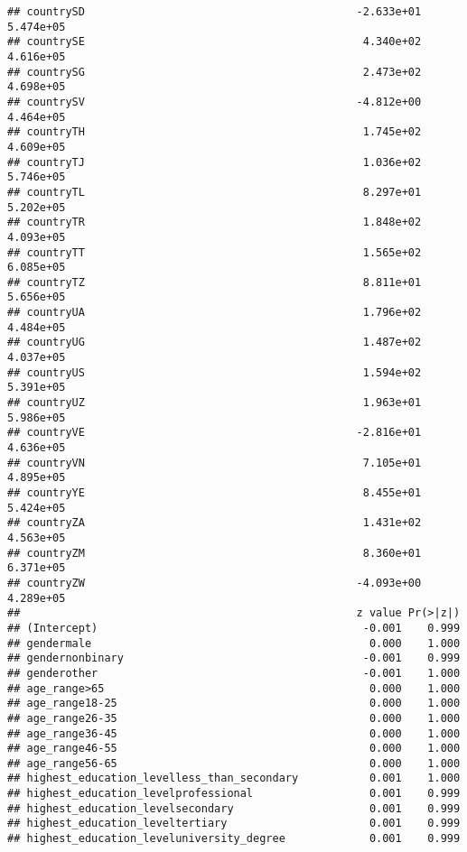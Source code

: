\documentclass[
]{article}
\begin{document}
\begin{verbatim}
## countrySD                                          -2.633e+01  5.474e+05
## countrySE                                           4.340e+02  4.616e+05
## countrySG                                           2.473e+02  4.698e+05
## countrySV                                          -4.812e+00  4.464e+05
## countryTH                                           1.745e+02  4.609e+05
## countryTJ                                           1.036e+02  5.746e+05
## countryTL                                           8.297e+01  5.202e+05
## countryTR                                           1.848e+02  4.093e+05
## countryTT                                           1.565e+02  6.085e+05
## countryTZ                                           8.811e+01  5.656e+05
## countryUA                                           1.796e+02  4.484e+05
## countryUG                                           1.487e+02  4.037e+05
## countryUS                                           1.594e+02  5.391e+05
## countryUZ                                           1.963e+01  5.986e+05
## countryVE                                          -2.816e+01  4.636e+05
## countryVN                                           7.105e+01  4.895e+05
## countryYE                                           8.455e+01  5.424e+05
## countryZA                                           1.431e+02  4.563e+05
## countryZM                                           8.360e+01  6.371e+05
## countryZW                                          -4.093e+00  4.289e+05
##                                                    z value Pr(>|z|)
## (Intercept)                                         -0.001    0.999
## gendermale                                           0.000    1.000
## gendernonbinary                                     -0.001    0.999
## genderother                                         -0.001    1.000
## age_range>65                                         0.000    1.000
## age_range18-25                                       0.000    1.000
## age_range26-35                                       0.000    1.000
## age_range36-45                                       0.000    1.000
## age_range46-55                                       0.000    1.000
## age_range56-65                                       0.000    1.000
## highest_education_levelless_than_secondary           0.001    1.000
## highest_education_levelprofessional                  0.001    0.999
## highest_education_levelsecondary                     0.001    0.999
## highest_education_leveltertiary                      0.001    0.999
## highest_education_leveluniversity_degree             0.001    0.999

\end{verbatim}
\end{document}
